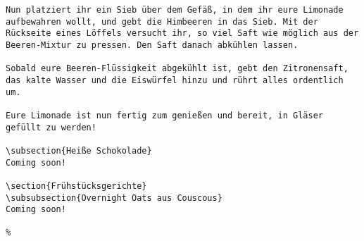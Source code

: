 \begin{verbatim}
Nun platziert ihr ein Sieb über dem Gefäß, in dem ihr eure Limonade aufbewahren wollt, und gebt die Himbeeren in das Sieb. Mit der Rückseite eines Löffels versucht ihr, so viel Saft wie möglich aus der Beeren-Mixtur zu pressen. Den Saft danach abkühlen lassen.
	
Sobald eure Beeren-Flüssigkeit abgekühlt ist, gebt den Zitronensaft, das kalte Wasser und die Eiswürfel hinzu und rührt alles ordentlich um.
	
Eure Limonade ist nun fertig zum genießen und bereit, in Gläser gefüllt zu werden!
	
\subsection{Heiße Schokolade}
Coming soon!
	
\section{Frühstücksgerichte}
\subsubsection{Overnight Oats aus Couscous}
Coming soon!
	
% 
\end{verbatim}